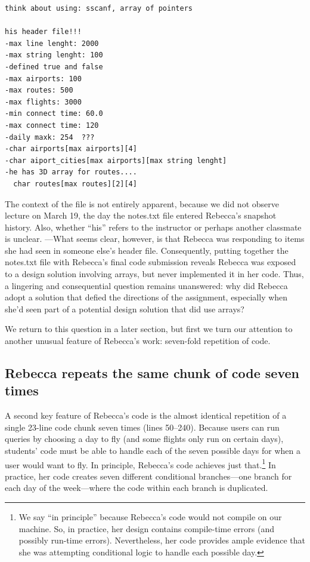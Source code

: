 \begin{verbatim}
think about using: sscanf, array of pointers

his header file!!!
-max line lenght: 2000
-max string lenght: 100
-defined true and false
-max airports: 100
-max routes: 500
-max flights: 3000
-min connect time: 60.0
-max connect time: 120
-daily maxk: 254  ???
-char airports[max airports][4]
-char aiport_cities[max airports][max string lenght]
-he has 3D array for routes....
  char routes[max routes][2][4]
\end{verbatim}

The context of the file is not entirely apparent, because we did not observe lecture on March 19, the day the notes.txt file entered Rebecca's snapshot history. Also, whether ``his'' refers to the instructor or perhaps another classmate is unclear. ---What seems clear, however, is that Rebecca was responding to items she had seen in someone else's header file. Consequently, putting together the notes.txt file with Rebecca's final code submission reveals Rebecca was exposed to a design solution involving arrays, but never implemented it in her code. Thus, a lingering and consequential question remains unanswered: why did Rebecca adopt a solution that defied the directions of the assignment, especially when she'd seen part of a potential design solution that did use arrays?

We return to this question in a later section, but first we turn our attention to another unusual feature of Rebecca's work: seven-fold repetition of code.

\subsection{Rebecca repeats the same chunk of code seven times}\label{rebecca-repeats-the-same-chunk-of-code-seven-times}

A second key feature of Rebecca's code is the almost identical repetition of a single 23-line code chunk seven times (lines 50--240). Because users can run queries by choosing a day to fly (and some flights only run on certain days), students' code must be able to handle each of the seven possible days for when a user would want to fly. In principle, Rebecca's code achieves just that.\footnote{We say ``in principle'' because Rebecca's code would not compile on our machine. So, in practice, her design contains compile-time errors (and possibly run-time errors). Nevertheless, her code provides ample evidence that she was attempting conditional logic to handle each possible day.} In practice, her code creates seven different conditional branches---one branch for each day of the week---where the code within each branch is duplicated.

